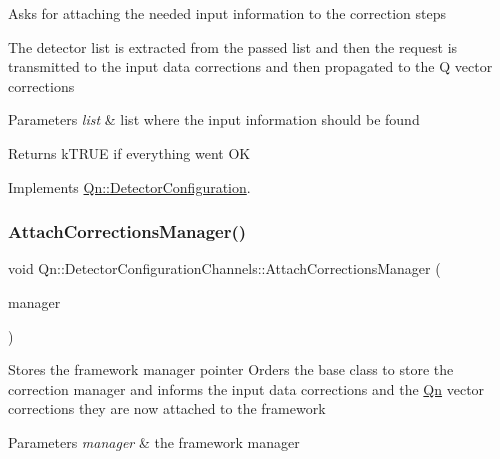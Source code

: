 Asks for attaching the needed input information to the correction steps

The detector list is extracted from the passed list and then the request is transmitted to the input data corrections and then propagated to the Q vector corrections 
\begin{DoxyParams}{Parameters}
{\em list} & list where the input information should be found \\
\hline
\end{DoxyParams}
\begin{DoxyReturn}{Returns}
k\+T\+R\+UE if everything went OK 
\end{DoxyReturn}


Implements \mbox{\hyperlink{classQn_1_1DetectorConfiguration_a4ae0eb587070e68a11fbb438d96fca15}{Qn\+::\+Detector\+Configuration}}.

\mbox{\label{classQn_1_1DetectorConfigurationChannels_a074acfba4bc0d41df71d53b98d682f57}} 
\subsubsection{\texorpdfstring{Attach\+Corrections\+Manager()}{AttachCorrectionsManager()}}
{\footnotesize\ttfamily void Qn\+::\+Detector\+Configuration\+Channels\+::\+Attach\+Corrections\+Manager (\begin{DoxyParamCaption}\item[{\mbox{\hyperlink{classQn_1_1CorrectionCalculator}{Correction\+Calculator}} $\ast$}]{manager }\end{DoxyParamCaption})\hspace{0.3cm}{\ttfamily [virtual]}}

Stores the framework manager pointer Orders the base class to store the correction manager and informs the input data corrections and the \mbox{\hyperlink{namespaceQn}{Qn}} vector corrections they are now attached to the framework 
\begin{DoxyParams}{Parameters}
{\em manager} & the framework manager \\
\hline
\end{DoxyParams}


